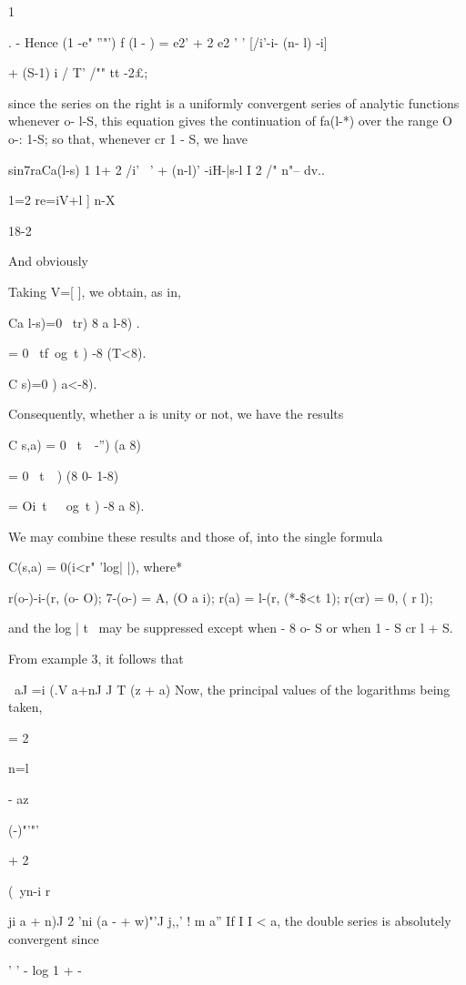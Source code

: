 {{1 %

. - Hence (1 -e" ''"') f (l - ) = e2' + 2 e2 ' ' [/i'-i- (n- l) -i]

+ (S-1) i / T' /"" tt -2£;

since the series on the right is a uniformly convergent series of
analytic functions whenever o- l-S, this equation gives the
continuation of fa(l-*) over the range O o-: 1-S; so that, whenever cr
1 - S, we have

sin7raCa(l-s) 1 1+ 2 /i' ~' + (n-l)' -iH-|s-l I 2 /" n"-- dv..

1=2 re=iV+l ] n-X

18-2

%
%

And obviously

Taking V=[ ], we obtain, as in,

Ca l-s)=0 \ tr) 8 a l-8) .

= 0 \ tf\ og\ t ) -8 (T<8).

C s)=0 ) a<-8).

Consequently, whether a is unity or not, we have the results

C s,a) = 0 \ t\ \ -'') (a 8)

= 0 \ t\ \ ) (8 0- 1-8)

= Oi\ t\ \ \ og\ t ) -8 a 8).

We may combine these results and those of, into the single
formula

C(s,a) = 0(i<r" 'log| |), where*

r(o-)-i-(r, (o- O); 7-(o-) = A, (O a i); r(a) = l-(r, (*-\$<t 1);
r(cr) = 0, ( r l);

and the log | t \ may be suppressed except when - 8 o- S or when 1 - S
cr l + S.

From example 3,
it follows that

\ aJ =i (.V a+nJ J T (z + a) Now, the principal values of the
logarithms being taken,

= 2

n=l

- az

  (-)"'"'

+ 2

(\ yn-i r

ji a + n)J 2 'ni (a - + w)"'J j,,' ! m a'' If I I < a, the double
series is absolutely convergent since

' ' - log 1 + -

}}
